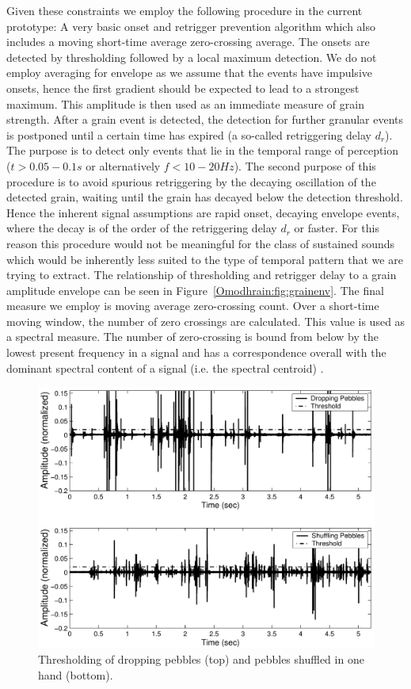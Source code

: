 Given these constraints we employ the following procedure in the
current prototype: A very basic onset and retrigger prevention
algorithm which also includes a moving short-time average
zero-crossing average. The onsets are detected by thresholding
followed by a local maximum detection. We do not employ averaging for
envelope as we assume that the events have impulsive onsets, hence the
first gradient should be expected to  lead to a strongest
maximum. This amplitude is then used as an immediate measure of grain
strength. After a grain event is detected, the detection for further
granular events is postponed until  a certain time has expired
(a so-called retriggering delay $d_r$). The purpose is to detect only
events that lie in the temporal range of perception ($t>0.05-0.1 s$ 
or alternatively $f<10-20Hz$). The second purpose of this procedure is
to avoid spurious retriggering by the decaying oscillation of the
detected grain, waiting until  the grain has decayed below the
detection threshold. Hence the inherent signal assumptions are rapid
onset, decaying envelope events, where the decay is of the order of
the retriggering delay $d_r$ or faster. For this reason this procedure would not
be meaningful for the class of sustained sounds which
would  be inherently less suited to the type of temporal pattern  that
we are trying to extract. The relationship of thresholding and retrigger delay to a grain amplitude envelope can be seen in Figure~\ref{Omodhrain:fig:grainenv}. The final measure we employ is moving average
zero-crossing count. Over a short-time moving window, the number of
zero crossings are calculated. This value is used as a spectral
measure. The number of zero-crossing is bound from below by the lowest
present frequency in a signal \cite{Eremenko:2003} and has a correspondence
overall with the dominant spectral content of a signal (i.e. the
spectral centroid) \cite{Panagiotakis:2004,Peeters:2002}.

\begin{figure}[t]
\centering
\includegraphics[width=\textwidth]{PebbleSpecPlot-eps-converted-to.pdf}
\caption{Thresholding of dropping pebbles (top) and pebbles shuffled in one hand (bottom).}
\label{Omodhrain:fig:dropgrab}
\end{figure}


